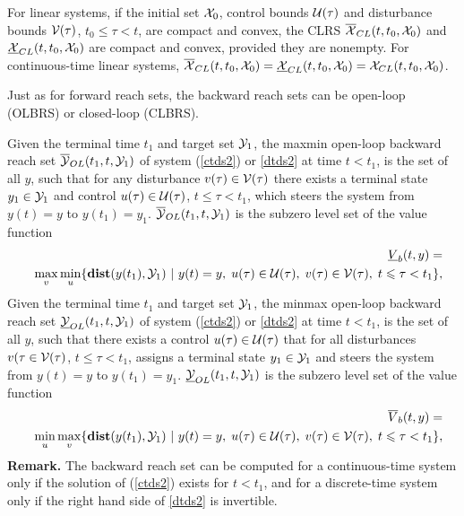 For linear systems,
if the initial set $\XX_0$, control bounds $\UU(\tau)$ and disturbance
bounds $\VV(\tau)$, $t_0\leq\tau<t$, are compact and convex, the
CLRS $\OXCL(t, t_0, \XX_0)$ and $\UXCL(t, t_0, \XX_0)$ are compact and convex, provided they are nonempty.
For continuous-time linear systems,
$\OXCL(t, t_0, \XX_0) = \UXCL(t, t_0, \XX_0) = \XX_{CL}(t, t_0, \XX_0)$.





Just as for forward reach sets, the backward reach sets can be open-loop (OLBRS)
or closed-loop (CLBRS).

Given the terminal time $t_1$ and target set $\YY_1$, the
maxmin open-loop backward reach set $\OYOL(t_1, t, \YY_1)$
of system (\ref{ctds2}) or \ref{dtds2} at time $t<t_1$, is the set of all $y$,
such that for any disturbance $v(\tau)\in\VV(\tau)$
there exists a terminal state $y_1\in\YY_1$ and control $u(\tau)\in\UU(\tau)$,
$t\leq\tau<t_1$, which steers the system
from $y(t)=y$ to $y(t_1)=y_1$.
\label{def_maxminolbrs}
\ed
$\OYOL(t_1, t, \YY_1)$ is the subzero level set of the value function
\begin{eqnarray}
&&\underline{V}_b(t, y) = \nonumber \\
&&\max_v\min_u\{{\bf dist}(y(t_1), \YY_1) ~|~ y(t)=y, \; u(\tau)\in\UU(\tau), \;
v(\tau)\in\VV(\tau), \; t\leq\tau<t_1\},
\label{maxminvfb}
\end{eqnarray}
Given the terminal time $t_1$ and target set $\YY_1$, the
minmax open-loop backward reach set $\UYOL(t_1, t, \YY_1)$
of system (\ref{ctds2}) or \ref{dtds2} at time $t<t_1$, is the set of all $y$,
such that there exists a control $u(\tau)\in\UU(\tau)$ that for all
disturbances $v(\tau\in\VV(\tau)$, $t\leq\tau<t_1$, assigns a terminal
state $y_1\in\YY_1$ and steers the system
from $y(t)=y$ to $y(t_1)=y_1$.
\label{def_minmaxolbrs}
\ed
$\UYOL(t_1, t, \YY_1)$ is the subzero level set of the value function
\begin{eqnarray}
&&\overline{V}_b(t, y) = \nonumber \\
&&\min_u\max_v\{{\bf dist}(y(t_1), \YY_1) ~|~ y(t)=y, \; u(\tau)\in\UU(\tau), \;
v(\tau)\in\VV(\tau), \; t\leq\tau<t_1\},
\label{minmaxvfb}
\end{eqnarray}
{\bf Remark.}
The backward reach set can be computed for a continuous-time system only if
the solution of (\ref{ctds2}) exists for $t<t_1$, and for a discrete-time
system only if the right hand side of \ref{dtds2} is invertible.

